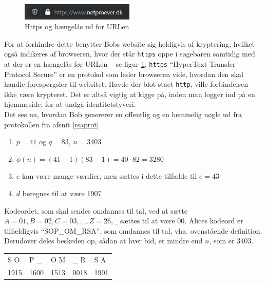 \begin{figure}
    \vspace{-30pt}
    \begin{center}
        \includegraphics[width=0.48\textwidth]{img/secure.png}
    \end{center}
    \vspace{-20pt}
    \caption{Https og hængelås ud for URLen}
    \label{sikker}
    \vspace{-10pt}
\end{figure}

For at forhindre dette benytter Bobs website sig heldigvis af kryptering, hvilket også indikeres af browseren, hvor der står \texttt{https} oppe i søgebaren samtidig med at der er en hængelås før URLen -- se figur \ref{sikker}.
\texttt{https} ``HyperText Transfer Protocol Secure'' er en protokol som lader browseren vide, hvordan den skal handle forespørgsler til websitet. \cite{https} Havde der blot stået \texttt{http}, ville forbindelsen ikke være krypteret. Det er altså vigtig at kigge på, inden man logger ind på en hjemmeside, for at undgå identitetstyveri.\\

Det ses nu, hvordan Bob genererer en offentlig og en hemmelig nøgle ud fra protokollen fra afsnit \ref{rsaprot}.

\begin{enumerate}%
    \item \(p = 41\) og \(q = 83\), \(n = 3403\)
    \item \(\phi(n) = (41 - 1) (83 - 1) = 40 \cdot 82 = 3280\)
    \item \(e\) kan være mange værdier, men sættes i dette tilfælde til \(e = 43\)
    \item \(d\) beregnes til at være 1907
\end{enumerate}

Kodeordet, som skal sendes omdannes til tal, ved at sætte \(A=01, B=02, C=03, \hdots , Z=26\), \(\_\) sættes til at være 00.
Alices kodeord er tilfældigvis ``SOP\_OM\_RSA'', som omdannes til tal, vha. ovenstående definition.
Derudover deles beskeden op, sådan at hver bid, er mindre end \(n\), som er 3403.
\begin{center}
    \begin{tabular}{l l l l l}
        S O  & P \_  & O M  & \_ R  & S A\\
        1915 & 1600  & 1513  & 0018   & 1901\\
    \end{tabular}
\end{center}

